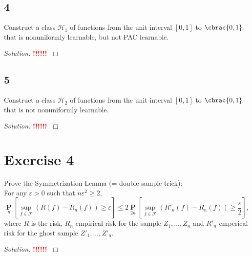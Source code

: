 \documentclass[10pt, a4paper, twoside]{amsart}
\theoremstyle{plain}
\DeclarePairedDelimiter\cbrac\{\}
\renewcommand{\P}{\operatorname*{\ensuremath{\mathbf{P}}}} %
\newcommand{\cH}{\ensuremath{\mathcal{H}}}
\newenvironment{solution}
               {\let\oldqedsymbol=\qedsymbol
                \renewcommand{\qedsymbol}{$\blacktriangleleft$}
                \begin{proof}[Solution]}
               {\end{proof}
                \renewcommand{\qedsymbol}{\oldqedsymbol}}
\newcommand{\TODO}{\textcolor{red}{\textbf{!!!!!! }}}
\begin{document}
\subsection*{4}
Construct a class $\cH_1$ of functions from the unit interval $[0,1]$ to $\cbrac{0,1}$ that is nonuniformly learnable, but not PAC learnable.
\begin{solution}
\TODO
\end{solution}
\subsection*{5}
Construct a class $\cH_2$ of functions from the unit interval $[0,1]$ to $\cbrac{0,1}$ that is not nonuniformly learnable.
\begin{solution}
\TODO
\end{solution}

\section*{Exercise 4}
Prove the Symmetrization Lemma (= double sample trick):\\
For any $\varepsilon >0$ such that $n \varepsilon^2 \geq 2$,
\begin{equation*}
  \P_n\left[ \sup_{f \in \mathcal{F}} (R(f) - R_n(f)) \geq \varepsilon \right] \leq 2 \P_{2n}\left[ \sup_{f \in \mathcal{F}} (R'_n(f) - R_n(f)) \geq \frac{\varepsilon}{2} \right],
\end{equation*}
where $R$ is the risk, $R_n$ empirical risk for the sample $Z_1, \ldots, Z_n$ and $R'_n$ emperical risk for the ghost sample $Z'_1, \ldots , Z'_n$.
 \begin{solution}
\TODO
 \end{solution}
\end{document}
